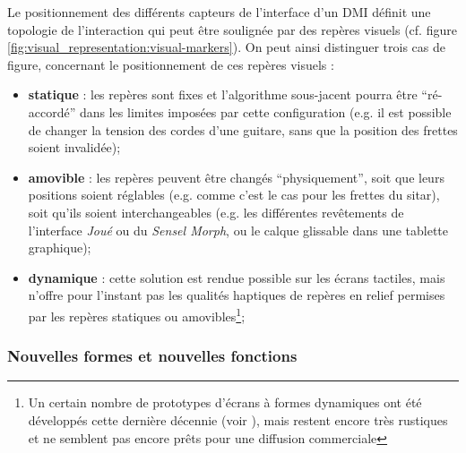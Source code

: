 \noindent Le positionnement des différents capteurs de l'interface d'un \gls{DMI} définit une topologie de l'interaction qui peut être soulignée par des repères visuels (cf. figure \ref{fig:visual_representation:visual-markers}). On peut ainsi distinguer trois cas de figure, concernant le positionnement de ces repères visuels :
\vspace{-1em}
\begin{itemize}[noitemsep]
	\item \textbf{statique} : les repères sont fixes et l'algorithme sous-jacent pourra être ``ré-accordé'' dans les limites imposées par cette configuration (e.g. il est possible de changer la tension des cordes d'une guitare, sans que la position des frettes soient invalidée);
	\item \textbf{amovible} : les repères peuvent être changés ``physiquement'', soit que leurs positions soient réglables (e.g. comme c'est le cas pour les frettes du sitar), soit qu'ils soient interchangeables (e.g. les différentes revêtements de l'interface \textit{Joué} ou du \textit{Sensel Morph}, ou le calque glissable dans une tablette graphique);
	\item \textbf{dynamique} : cette solution est rendue possible sur les écrans tactiles, mais n'offre pour l'instant pas les qualités haptiques de repères en relief permises par les repères statiques ou amovibles\footnote{Un certain nombre de prototypes d'écrans à formes dynamiques ont été développés cette dernière décennie (voir \cite{follmer_inform_2013, siu_shapeshift_2018}), mais restent encore très rustiques et ne semblent pas encore prêts pour une diffusion commerciale};
\end{itemize}


\subsubsection{Nouvelles formes et nouvelles fonctions}


